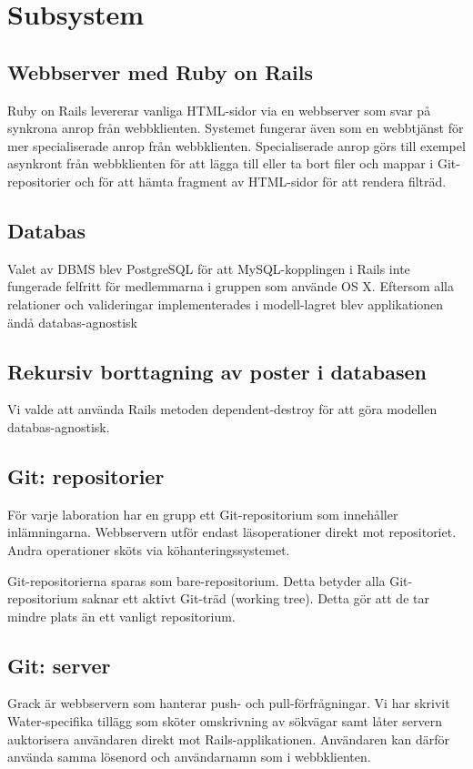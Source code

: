 \section{Subsystem}
\subsection{Webbserver med Ruby on Rails}
Ruby on Rails levererar vanliga HTML-sidor via en webbserver som svar på synkrona anrop från webbklienten. Systemet fungerar även som en webbtjänst för mer specialiserade anrop från webbklienten. Specialiserade anrop görs till exempel asynkront från webbklienten för att lägga till eller ta bort filer och mappar i Git-repositorier och för att hämta fragment av HTML-sidor för att rendera filträd.
\subsection{Databas}
Valet av DBMS blev PostgreSQL för att MySQL-kopplingen i Rails inte fungerade felfritt för medlemmarna i gruppen som använde OS X. Eftersom alla relationer och valideringar implementerades i modell-lagret blev applikationen ändå databas-agnostisk
\subsection{Rekursiv borttagning av poster i databasen}
Vi valde att använda Rails metoden dependent-destroy för att göra modellen databas-agnostisk.
\subsection{Git: repositorier}
För varje laboration har en grupp ett Git-repositorium som innehåller inlämningarna. Webbservern utför endast läsoperationer direkt mot repositoriet. Andra operationer sköts via köhanteringssystemet.

Git-repositorierna sparas som bare-repositorium. Detta betyder alla Git-repositorium saknar ett aktivt Git-träd (working tree). Detta gör att de tar mindre plats än ett vanligt repositorium.
\subsection{Git: server}
Grack är webbservern som hanterar push- och pull-förfrågningar. Vi har skrivit Water-specifika tillägg som sköter omskrivning av sökvägar samt låter servern auktorisera användaren direkt mot Rails-applikationen. Användaren kan därför använda samma lösenord och användarnamn som i webbklienten.

